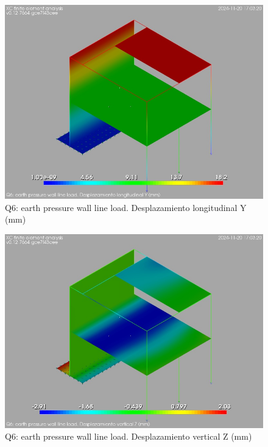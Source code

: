 \begin{figure}[ht]
\begin{center}
\includegraphics[width=\linewidth]{results/graphics/resSimplLC/QearthPWallHrzLuY.png}
\caption{Q6: earth pressure wall line load. Desplazamiento longitudinal Y (mm)}
\label{QearthPWallHrzLuY}
\end{center}
\end{figure}
\begin{figure}[ht]
\begin{center}
\includegraphics[width=\linewidth]{results/graphics/resSimplLC/QearthPWallHrzLuZ.png}
\caption{Q6: earth pressure wall line load. Desplazamiento vertical Z (mm)}
\label{QearthPWallHrzLuZ}
\end{center}
\end{figure}
